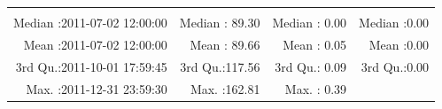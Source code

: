 \documentclass[
  10pt,
  a4paper,oneside]{article}
\begin{document}
\begin{longtable}[]{@{}rrrr@{}}
\begin{minipage}[t]{0.18\columnwidth}
\end{minipage}\tabularnewline
\begin{minipage}[t]{0.34\columnwidth}\raggedleft
Median :2011-07-02 12:00:00\strut
\end{minipage} & \begin{minipage}[t]{0.19\columnwidth}\raggedleft
Median : 89.30\strut
\end{minipage} & \begin{minipage}[t]{0.18\columnwidth}\raggedleft
Median : 0.00\strut
\end{minipage} & \begin{minipage}[t]{0.18\columnwidth}\raggedleft
Median :0.00\strut
\end{minipage}\tabularnewline
\begin{minipage}[t]{0.34\columnwidth}\raggedleft
Mean :2011-07-02 12:00:00\strut
\end{minipage} & \begin{minipage}[t]{0.19\columnwidth}\raggedleft
Mean : 89.66\strut
\end{minipage} & \begin{minipage}[t]{0.18\columnwidth}\raggedleft
Mean : 0.05\strut
\end{minipage} & \begin{minipage}[t]{0.18\columnwidth}\raggedleft
Mean :0.00\strut
\end{minipage}\tabularnewline
\begin{minipage}[t]{0.34\columnwidth}\raggedleft
3rd Qu.:2011-10-01 17:59:45\strut
\end{minipage} & \begin{minipage}[t]{0.19\columnwidth}\raggedleft
3rd Qu.:117.56\strut
\end{minipage} & \begin{minipage}[t]{0.18\columnwidth}\raggedleft
3rd Qu.: 0.09\strut
\end{minipage} & \begin{minipage}[t]{0.18\columnwidth}\raggedleft
3rd Qu.:0.00\strut
\end{minipage}\tabularnewline
\begin{minipage}[t]{0.34\columnwidth}\raggedleft
Max. :2011-12-31 23:59:30\strut
\end{minipage} & \begin{minipage}[t]{0.19\columnwidth}\raggedleft
Max. :162.81\strut
\end{minipage} & \begin{minipage}[t]{0.18\columnwidth}\raggedleft
Max. : 0.39\strut
\end{minipage} & \begin{minipage}[t]{0.18\columnwidth}\raggedleft

\end{minipage}
\end{longtable}
\end{document}
